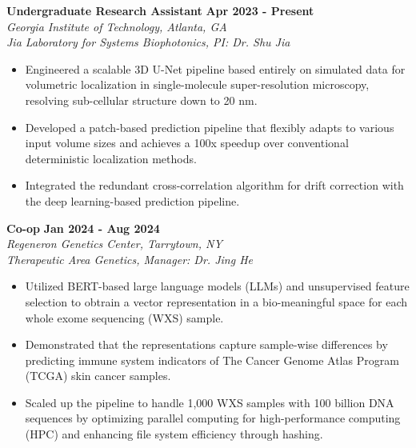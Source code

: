 \documentclass[letterpaper, 11pt]{article}
\newcommand{\subsectionvspace}{\vspace{6pt}}
\begin{document}

    \textbf{Undergraduate Research Assistant} \hfill 
    \textbf{Apr 2023 - Present} \\
    \textit{Georgia Institute of Technology, Atlanta, GA} \\
    \textit{Jia Laboratory for Systems Biophotonics, PI: Dr. Shu Jia}
    \begin{itemize}
        \item Engineered a scalable 3D U-Net pipeline based entirely on simulated data for volumetric localization in single-molecule super-resolution microscopy, resolving sub-cellular structure down to 20 nm.
        \item Developed a patch-based prediction pipeline that flexibly adapts to various input volume sizes and achieves a 100x speedup over conventional deterministic localization methods.
        \item Integrated the redundant cross-correlation algorithm for drift correction with the deep learning-based prediction pipeline.
    \end{itemize}

    \subsectionvspace

    \textbf{Co-op} \hfill 
    \textbf{Jan 2024 - Aug 2024} \\
    \textit{Regeneron Genetics Center, Tarrytown, NY} \\
    \textit{Therapeutic Area Genetics, Manager: Dr. Jing He}
    \begin{itemize}
        \item Utilized BERT-based large language models (LLMs) and unsupervised feature selection to obtrain a vector representation in a bio-meaningful space for each whole exome sequencing (WXS) sample.
        \item Demonstrated that the representations capture sample-wise differences by predicting immune system indicators of The Cancer Genome Atlas Program (TCGA) skin cancer samples.
        \item Scaled up the pipeline to handle 1,000 WXS samples with 100 billion DNA sequences by optimizing parallel computing for high-performance computing (HPC) and enhancing file system efficiency through hashing.
    \end{itemize}

    \subsectionvspace
\end{document}
